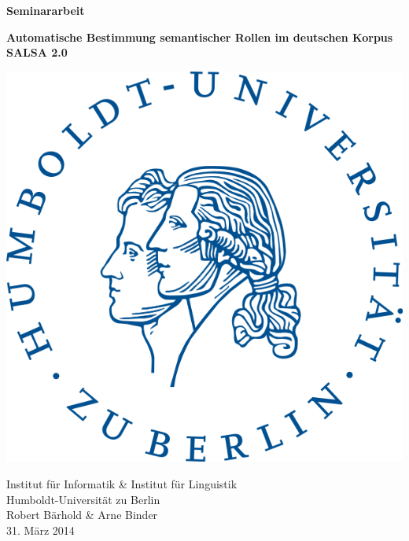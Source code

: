 \documentclass[12pt]{article}
\begin{document}
\begin{center}
	\pagestyle{fancy} %
	\renewcommand{\headrulewidth}{0pt} %
	\renewcommand{\footrulewidth}{0pt} %
	
	\vspace*{\fill}
	
	\Huge{\textbf{Seminararbeit}}\\
	\vspace{1.5cm}
	
	\Large{\textbf{Automatische Bestimmung semantischer Rollen im deutschen
	Korpus SALSA 2.0}}\\
	\vspace{1cm}
		
	\includegraphics[scale=0.3]{images/logo_hu.png}
	\vspace{1cm}

	\begin{Large}
		Institut für Informatik \& Institut für Linguistik\\
		Humboldt-Universität zu Berlin\\
		\vspace{1.5cm}
		Robert Bärhold \& Arne Binder \\
		31. März 2014 \\
		\vspace{1cm}
		

\end{Large}
\end{center}
\end{document}
